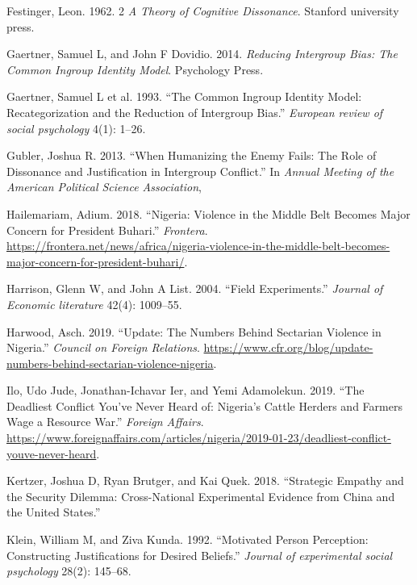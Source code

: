 \documentclass[11pt]{article}
\begin{document}
\leavevmode\hypertarget{ref-festinger1962cognitiveDissonance}{}%
Festinger, Leon. 1962. 2 \emph{A Theory of Cognitive Dissonance}.
Stanford university press.

\leavevmode\hypertarget{ref-gaertner2014reducing}{}%
Gaertner, Samuel L, and John F Dovidio. 2014. \emph{Reducing Intergroup
Bias: The Common Ingroup Identity Model}. Psychology Press.

\leavevmode\hypertarget{ref-gaertner1993common}{}%
Gaertner, Samuel L et al. 1993. ``The Common Ingroup Identity Model:
Recategorization and the Reduction of Intergroup Bias.'' \emph{European
review of social psychology} 4(1): 1--26.

\leavevmode\hypertarget{ref-gubler2013humanizing}{}%
Gubler, Joshua R. 2013. ``When Humanizing the Enemy Fails: The Role of
Dissonance and Justification in Intergroup Conflict.'' In \emph{Annual
Meeting of the American Political Science Association},

\leavevmode\hypertarget{ref-frontera2018nigeria}{}%
Hailemariam, Adium. 2018. ``Nigeria: Violence in the Middle Belt Becomes
Major Concern for President Buhari.'' \emph{Frontera}.
\url{https://frontera.net/news/africa/nigeria-violence-in-the-middle-belt-becomes-major-concern-for-president-buhari/}.

\leavevmode\hypertarget{ref-harrison2004field}{}%
Harrison, Glenn W, and John A List. 2004. ``Field Experiments.''
\emph{Journal of Economic literature} 42(4): 1009--55.

\leavevmode\hypertarget{ref-council2019nigeria}{}%
Harwood, Asch. 2019. ``Update: The Numbers Behind Sectarian Violence in
Nigeria.'' \emph{Council on Foreign Relations}.
\url{https://www.cfr.org/blog/update-numbers-behind-sectarian-violence-nigeria}.

\leavevmode\hypertarget{ref-fa2019deadly}{}%
Ilo, Udo Jude, Jonathan-Ichavar Ier, and Yemi Adamolekun. 2019. ``The
Deadliest Conflict You've Never Heard of: Nigeria's Cattle Herders and
Farmers Wage a Resource War.'' \emph{Foreign Affairs}.
\url{https://www.foreignaffairs.com/articles/nigeria/2019-01-23/deadliest-conflict-youve-never-heard}.

\leavevmode\hypertarget{ref-kertzer2018empathy}{}%
Kertzer, Joshua D, Ryan Brutger, and Kai Quek. 2018. ``Strategic Empathy
and the Security Dilemma: Cross-National Experimental Evidence from
China and the United States.''

\leavevmode\hypertarget{ref-klein1992motivated}{}%
Klein, William M, and Ziva Kunda. 1992. ``Motivated Person Perception:
Constructing Justifications for Desired Beliefs.'' \emph{Journal of
experimental social psychology} 28(2): 145--68.
\end{document}
